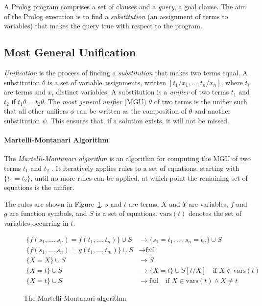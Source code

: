 A Prolog program comprises a set of clauses and a \emph{query}, a goal clause. The aim of the Prolog execution is to find a \emph{substitution} (an assignment of terms to variables) that makes the query true with respect to the program.

\subsection{Most General Unification}

\emph{Unification} is the process of finding a \emph{substitution} that makes two terms equal. A substitution $\theta$ is a set of variable assignments, written $[t_1/x_1, \ldots, t_n/x_n]$, where $t_i$ are terms and $x_i$ distinct variables. A substitution is a \emph{unifier} of two terms $t_1$ and $t_2$ if $t_1\theta = t_2\theta$. The \emph{most general unifier} (MGU) $\theta$ of two terms is the unifier such that all other unifiers $\phi$ can be written as the composition of $\theta$ and another substitution $\psi$. This ensures that, if a solution exists, it will not be missed.

\paragraph{Martelli-Montanari Algorithm}

The \emph{Martelli-Montanari algorithm} is an algorithm for computing the MGU of two terms $t_1$ and $t_2$ \cite{martelliEfficientUnificationAlgorithm1982}. It iteratively applies rules to a set of equations, starting with $\{t_1 = t_2\}$, until no more rules can be applied, at which point the remaining set of equations is the unifier.

The rules are shown in Figure~\ref{fig:martelli-montanari}. $s$ and $t$ are terms, $X$ and $Y$ are variables, $f$ and $g$ are function symbols, and $S$ is a set of equations. $\text{vars}(t)$ denotes the set of variables occurring in $t$.

\begin{figure}[H]
\begin{align*}
\{f(s_1, \ldots, s_n) = f(t_1, \ldots, t_n)\} \cup S &\rightarrow \{s_1 = t_1, \ldots, s_n = t_n\} \cup S \\
\{f(s_1, \ldots, s_n) = g(t_1, \ldots, t_m)\} \cup S &\rightarrow \text{fail} \\
\{X = X\} \cup S &\rightarrow S \\
\{X = t\} \cup S &\rightarrow \{X = t\} \cup S[t/X] \quad \text{if } X \notin \text{vars}(t) \\
\{X = t\} \cup S &\rightarrow \text{fail} \quad \text{if } X \in \text{vars}(t) \land X \neq t
\end{align*}
\caption{The Martelli-Montanari algorithm}
\label{fig:martelli-montanari}
\end{figure}

